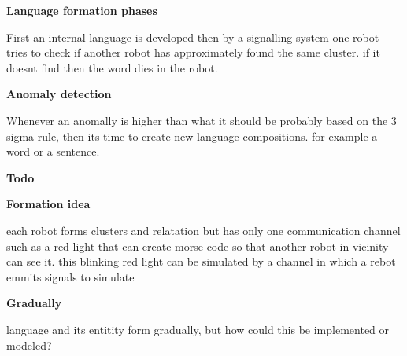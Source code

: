 \documentclass{book}
\providecommand{\ProjectDeepHeading}[2]{%
    \par\medskip\noindent\textbf{#2}\par\smallskip
}
\begin{document}
\ProjectDeepHeading{5}{Language formation phases}
First an internal language is developed then by a signalling system one robot tries to check if another robot has approximately found the same cluster. if it doesnt find then the word dies in the robot.

\ProjectDeepHeading{2}{Anomaly detection}
Whenever an anomally is higher than what it should be probably based on the 3 sigma rule, then its time to create new language compositions. for example a word or a sentence.


\ProjectDeepHeading{2}{Todo}
    \ProjectDeepHeading{5}{Formation idea}
        each robot  forms clusters and relatation but has only one communication channel such as a red light that can create morse code so that another robot in vicinity can see it. this blinking red light can be simulated by a channel in which a rebot emmits signals to simulate
    
    \ProjectDeepHeading{5}{Gradually}
        language and its entitity form gradually, but how could this be implemented or modeled?
\end{document}

